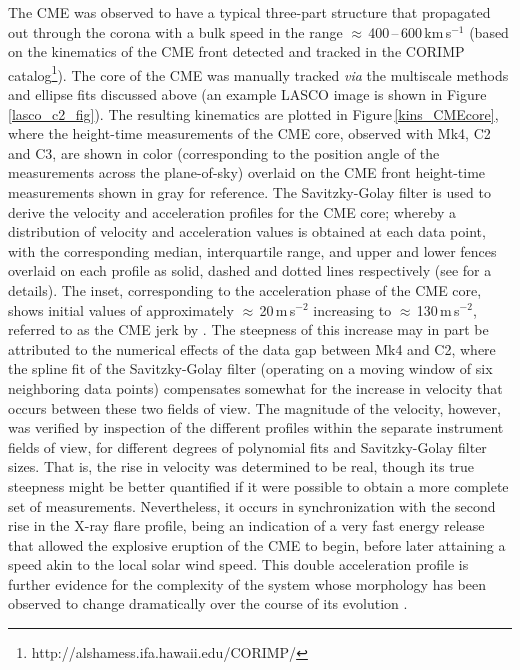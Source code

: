 \documentclass[namedreferences]{solarphysics}
\begin{document}
\begin{article}
The CME was observed to have a typical three-part structure that propagated out through the corona with a bulk speed in the range $\approx$\,400\,--\,600\,km\,s$^{-1}$ (based on the kinematics of the CME front detected and tracked in the CORIMP catalog\footnote{http://alshamess.ifa.hawaii.edu/CORIMP/}). The core of the CME was manually tracked \emph{via} the multiscale methods and ellipse fits discussed above (an example LASCO image is shown in Figure\,\ref{lasco_c2_fig}). The resulting kinematics are plotted in Figure\,\ref{kins_CMEcore}, where the height-time measurements of the CME core, observed with Mk4, C2 and C3, are shown in color (corresponding to the position angle of the measurements across the plane-of-sky) overlaid on the CME front height-time measurements shown in gray for reference. The Savitzky-Golay filter is used to derive the velocity and acceleration profiles for the CME core; whereby a distribution of velocity and acceleration values is obtained at each data point, with the corresponding median, interquartile range, and upper and lower fences overlaid on each profile as solid, dashed and dotted lines respectively (see  for a details). The inset, corresponding to the acceleration phase of the CME core, shows initial values of approximately $\approx$\,20\,m\,s$^{-2}$ increasing to $\approx$\,130\,m\,s$^{-2}$, referred to as the CME jerk by . The steepness of this increase may in part be attributed to the numerical effects of the data gap between Mk4 and C2, where the spline fit of the Savitzky-Golay filter (operating on a moving window of six neighboring data points) compensates somewhat for the increase in velocity that occurs between these two fields of view. The magnitude of the velocity, however, was verified by inspection of the different profiles within the separate instrument fields of view, for different degrees of polynomial fits and Savitzky-Golay filter sizes. That is, the rise in velocity was determined to be real, though its true steepness might be better quantified if it were possible to obtain a more complete set of measurements. Nevertheless, it occurs in synchronization with the second rise in the X-ray flare profile, being an indication of a very fast energy release that allowed the explosive eruption of the CME to begin, before later attaining a speed akin to the local solar wind speed. This double acceleration profile is further evidence for the complexity of the system whose morphology has been observed to change dramatically over the course of its evolution \cite{2012ApJ...746L...5S,2013ApJS..206...19M}.




\end{article}
\end{document}
